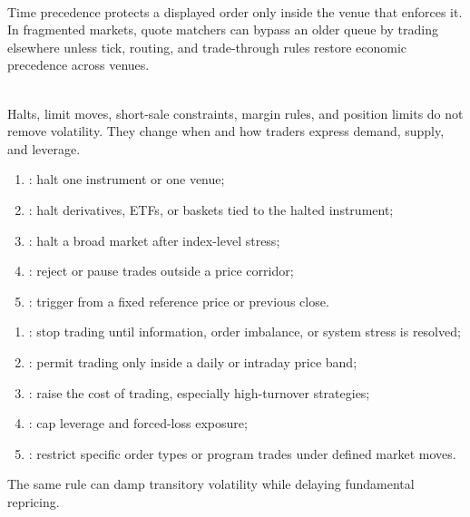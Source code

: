 \documentclass[a4paper,oneside,openany]{book}
\begin{document}
\begin{caveat} \\
Time precedence protects a displayed order only inside the venue that enforces it.\\
In fragmented markets, quote matchers can bypass an older queue by trading elsewhere unless tick, routing, and trade-through rules restore economic precedence across venues.
\end{caveat}

\begin{marketrule} \\
Halts, limit moves, short-sale constraints, margin rules, and position limits do not remove volatility. They change when and how traders express demand, supply, and leverage.
\end{marketrule}

\begin{taxonomy} 
\begin{enumerate}[label=\roman*.]
\setlength{\itemsep}{0pt}
\item {}: halt one instrument or one venue;
\item {}: halt derivatives, ETFs, or baskets tied to the halted instrument;
\item {}: halt a broad market after index-level stress;
\item {}: reject or pause trades outside a price corridor;
\item {}: trigger from a fixed reference price or previous close.
\end{enumerate}
\end{taxonomy}

\begin{taxonomy} 
\begin{enumerate}[label=\roman*.]
\setlength{\itemsep}{0pt}
\item {}: stop trading until information, order imbalance, or system stress is resolved;
\item {}: permit trading only inside a daily or intraday price band;
\item {}: raise the cost of trading, especially high-turnover strategies;
\item {}: cap leverage and forced-loss exposure;
\item {}: restrict specific order types or program trades under defined market moves.
\end{enumerate}
The same rule can damp transitory volatility while delaying fundamental repricing.
\end{taxonomy}
\end{document}
